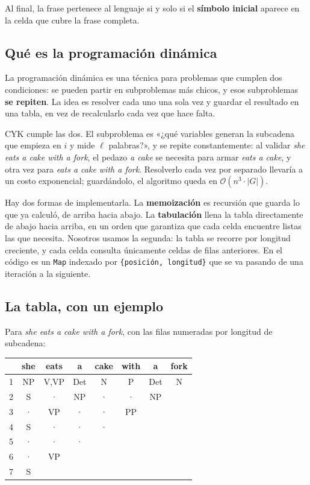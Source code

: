 \documentclass[11pt,a4paper]{article}
\begin{document}
Al final, la frase pertenece al lenguaje si y solo si el \textbf{símbolo
inicial} aparece en la celda que cubre la frase completa.

\subsection{Qué es la programación dinámica}

La programación dinámica es una técnica para problemas que cumplen dos
condiciones: se pueden partir en subproblemas más chicos, y esos subproblemas
\textbf{se repiten}. La idea es resolver cada uno una sola vez y guardar el
resultado en una tabla, en vez de recalcularlo cada vez que hace falta.

CYK cumple las dos. El subproblema es «¿qué variables generan la subcadena que
empieza en $i$ y mide $\ell$ palabras?», y se repite constantemente: al validar
\textit{she eats a cake with a fork}, el pedazo \textit{a cake} se necesita para
armar \textit{eats a cake}, y otra vez para \textit{eats a cake with a fork}.
Resolverlo cada vez por separado llevaría a un costo exponencial; guardándolo,
el algoritmo queda en $\mathcal{O}(n^3 \cdot |G|)$.

Hay dos formas de implementarla. La \textbf{memoización} es recursión que
guarda lo que ya calculó, de arriba hacia abajo. La \textbf{tabulación} llena
la tabla directamente de abajo hacia arriba, en un orden que garantiza que cada
celda encuentre listas las que necesita. Nosotros usamos la segunda: la tabla
se recorre por longitud creciente, y cada celda consulta únicamente celdas de
filas anteriores. En el código es un \texttt{Map} indexado por
\texttt{\{posición, longitud\}} que se va pasando de una iteración a la
siguiente.

\subsection{La tabla, con un ejemplo}

Para \textit{she eats a cake with a fork}, con las filas numeradas por
longitud de subcadena:

\begin{center}
\ttfamily\footnotesize
\begin{tabular}{@{}r|ccccccc@{}}
   & she & eats & a   & cake & with & a   & fork \\
\midrule
 1 & NP  & V,VP & Det & N    & P    & Det & N \\
 2 & S   & ·    & NP  & ·    & ·    & NP  &   \\
 3 & ·   & VP   & ·   & ·    & PP   &     &   \\
 4 & S   & ·    & ·   & ·    &      &     &   \\
 5 & ·   & ·    & ·   &      &      &     &   \\
 6 & ·   & VP   &     &      &      &     &   \\
 7 & S   &      &     &      &      &     &   \\
\end{tabular}
\end{center}
\end{document}
